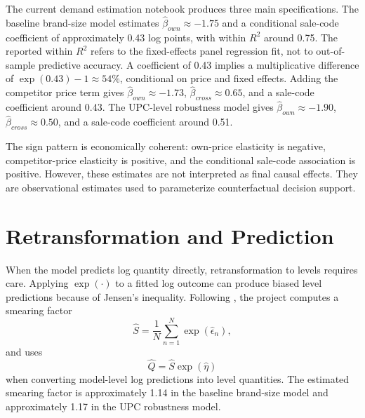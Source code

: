 \documentclass[11pt]{article}
\begin{document}
The current demand estimation notebook produces three main specifications. The baseline brand-size model estimates $\widehat{\beta}_{own}\approx -1.75$ and a conditional sale-code coefficient of approximately 0.43 log points, with within $R^2$ around 0.75. The reported within $R^2$ refers to the fixed-effects panel regression fit, not to out-of-sample predictive accuracy. A coefficient of 0.43 implies a multiplicative difference of $\exp(0.43)-1\approx 54\%$, conditional on price and fixed effects. Adding the competitor price term gives $\widehat{\beta}_{own}\approx -1.73$, $\widehat{\beta}_{cross}\approx 0.65$, and a sale-code coefficient around 0.43. The UPC-level robustness model gives $\widehat{\beta}_{own}\approx -1.90$, $\widehat{\beta}_{cross}\approx 0.50$, and a sale-code coefficient around 0.51.

The sign pattern is economically coherent: own-price elasticity is negative, competitor-price elasticity is positive, and the conditional sale-code association is positive. However, these estimates are not interpreted as final causal effects. They are observational estimates used to parameterize counterfactual decision support.

\section{Retransformation and Prediction}

When the model predicts log quantity directly, retransformation to levels requires care. Applying $\exp(\cdot)$ to a fitted log outcome can produce biased level predictions because of Jensen's inequality. Following \citet{duan1983}, the project computes a smearing factor
\begin{equation}
\widehat{S}=\frac{1}{N}\sum_{n=1}^{N}\exp(\widehat{\epsilon}_n),
\label{eq:smearing}
\end{equation}
and uses
\begin{equation}
\widehat{Q}=\widehat{S}\exp(\widehat{\eta})
\end{equation}
when converting model-level log predictions into level quantities. The estimated smearing factor is approximately 1.14 in the baseline brand-size model and approximately 1.17 in the UPC robustness model.
\end{document}
